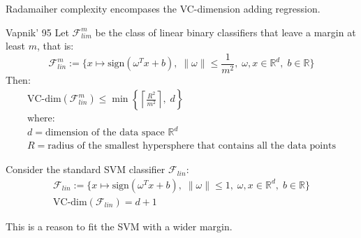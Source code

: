 \begin{note}
	Radamaiher complexity encompases the VC-dimension adding
	regression.
\end{note}


\begin{theorem}{Vapnik' 95}{}
	Let $\mathcal{F}_{lim}^m$ be the class of linear binary classifiers that leave
	a margin at least $m$, that is:
	\begin{equation*}
		\mathcal{F}_{lin}^m := \{ x \mapsto \text{sign}( \omega^T x + b), \;
		\lVert \omega \rVert \leq \frac{1}{m^2}, \;
		\omega, x \in \mathds{R}^d,\;
		b \in \mathds{R} \}
	\end{equation*}
	Then:
	\begin{align*}
		\text{VC-dim}(\mathcal{F}_{lin}^m)  \leq \min \left\{
		\left\lceil \frac{R^2}{m^2} \right\rceil, \;
		d
		\right\}                                                                               \\
		\text{where:}                                                                          \\
		d                                   = \text{dimension of the data space } \mathds{R}^d \\
		R                                   = \text{radius of the smallest hypersphere that contains all the data points}
	\end{align*}
\end{theorem}

Consider the standard SVM classifier $\mathcal{F}_{lin}$:
\begin{align*}
	\mathcal{F}_{lin} := \{ x \mapsto \text{sign}( \omega^T x + b), \;
	\lVert \omega \rVert \leq 1, \;
	\omega, x \in \mathds{R}^d,\;
	b \in \mathds{R} \} \\
	\text{VC-dim}(\mathcal{F}_{lin}) = d + 1
\end{align*}

This is a reason to fit the SVM with a wider margin.
